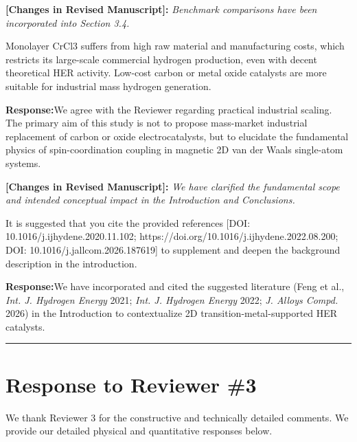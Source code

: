 \documentclass[11pt, sans, a4paper]{moderncv}
\newcommand{\response}{\vspace{0.4em}\noindent\textbf{\color{actionblue}Response:}\hspace{0.5em}}
\newcommand{\manuscriptchange}[1]{\vspace{0.3em}\noindent\textbf{\color{acsblue}[Changes in Revised Manuscript]:} \textit{#1}\vspace{0.4em}}
\begin{document}
\manuscriptchange{Benchmark comparisons have been incorporated into Section 3.4.}

\begin{reviewercomment}
Monolayer CrCl3 suffers from high raw material and manufacturing costs, which restricts its large-scale commercial hydrogen production, even with decent theoretical HER activity. Low-cost carbon or metal oxide catalysts are more suitable for industrial mass hydrogen generation.
\end{reviewercomment}

\response We agree with the Reviewer regarding practical industrial scaling. The primary aim of this study is not to propose mass-market industrial replacement of carbon or oxide electrocatalysts, but to elucidate the fundamental physics of spin-coordination coupling in magnetic 2D van der Waals single-atom systems. 

\manuscriptchange{We have clarified the fundamental scope and intended conceptual impact in the Introduction and Conclusions.}

\begin{reviewercomment}
It is suggested that you cite the provided references [DOI: 10.1016/j.ijhydene.2020.11.102; https://doi.org/10.1016/j.ijhydene.2022.08.200; DOI: 10.1016/j.jallcom.2026.187619] to supplement and deepen the background description in the introduction.
\end{reviewercomment}

\response We have incorporated and cited the suggested literature (Feng et al., \textit{Int. J. Hydrogen Energy} 2021; \textit{Int. J. Hydrogen Energy} 2022; \textit{J. Alloys Compd.} 2026) in the Introduction to contextualize 2D transition-metal-supported HER catalysts.

\vspace{1.5em}
\noindent\rule{\textwidth}{0.6pt}

\newpage

\section{Response to Reviewer \#3}

\noindent We thank Reviewer 3 for the constructive and technically detailed comments. We provide our detailed physical and quantitative responses below.
\end{document}
